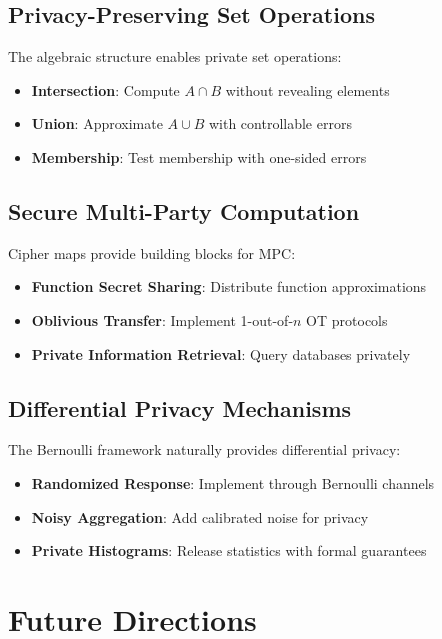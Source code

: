 \documentclass[11pt]{article}
\theoremstyle{definition}
\theoremstyle{plain}
\theoremstyle{remark}
\begin{document}
\subsection{Privacy-Preserving Set Operations}

The algebraic structure enables private set operations:
\begin{itemize}
\item \textbf{Intersection}: Compute $A \cap B$ without revealing elements
\item \textbf{Union}: Approximate $A \cup B$ with controllable errors
\item \textbf{Membership}: Test membership with one-sided errors
\end{itemize}

\subsection{Secure Multi-Party Computation}

Cipher maps provide building blocks for MPC:
\begin{itemize}
\item \textbf{Function Secret Sharing}: Distribute function approximations
\item \textbf{Oblivious Transfer}: Implement 1-out-of-$n$ OT protocols
\item \textbf{Private Information Retrieval}: Query databases privately
\end{itemize}

\subsection{Differential Privacy Mechanisms}

The Bernoulli framework naturally provides differential privacy:
\begin{itemize}
\item \textbf{Randomized Response}: Implement through Bernoulli channels
\item \textbf{Noisy Aggregation}: Add calibrated noise for privacy
\item \textbf{Private Histograms}: Release statistics with formal guarantees
\end{itemize}

\section{Future Directions}
\end{document}
